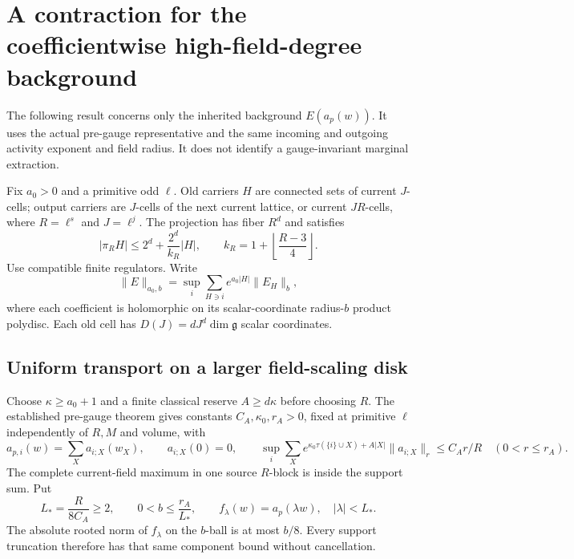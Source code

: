 \section{A contraction for the coefficientwise high-field-degree background}
\label{cdh-section}

The following result concerns only the inherited background
$E(a_p(w))$. It uses the actual pre-gauge representative and the
same incoming and outgoing activity exponent and field radius.
It does not identify a gauge-invariant marginal extraction.

Fix $a_0>0$ and a primitive odd $\ell$. Old carriers $H$ are
connected sets of current $J$-cells; output carriers are
$J$-cells of the next current lattice, or current $JR$-cells,
where $R=\ell^s$ and $J=\ell^j$. The projection has fiber $R^d$
and satisfies
\begin{equation}
 |\pi_RH|\leq2^d+\frac{2^d}{k_R}|H|,
 \qquad k_R=1+\left\lfloor\frac{R-3}{4}\right\rfloor.
 \label{cdh-compression}
\end{equation}
Use compatible finite regulators. Write
\begin{equation}
 \|E\|_{a_0,b}
 =\sup_i\sum_{H\ni i}e^{a_0|H|}\|E_H\|_b,
 \label{cdh-input-norm}
\end{equation}
where each coefficient is holomorphic on its scalar-coordinate
radius-$b$ product polydisc. Each old cell has
$D(J)=dJ^d\dim\mathfrak g$ scalar coordinates.

\subsection{Uniform transport on a larger field-scaling disk}
\label{cdh-scaling-section}

Choose $\kappa\geq a_0+1$ and a finite classical reserve
$A\geq d\kappa$ before choosing $R$. The established pre-gauge
theorem gives constants $C_A,\kappa_0,r_A>0$, fixed at primitive
$\ell$ independently of $R,M$ and volume, with
\begin{equation}
 a_{p,i}(w)=\sum_Xa_{i;X}(w_X),\qquad a_{i;X}(0)=0,\qquad
 \sup_i\sum_Xe^{\kappa_0\tau(\{i\}\cup X)+A|X|}
                   \|a_{i;X}\|_r\leq C_A r/R
 \quad(0<r\leq r_A).
 \label{cdh-ap-input}
\end{equation}
The complete current-field maximum in one source $R$-block is
inside the support sum. Put
\begin{equation}
 L_*=\frac{R}{8C_A}\geq2,\qquad
 0<b\leq\frac{r_A}{L_*},\qquad
 f_\lambda(w)=a_p(\lambda w),\quad |\lambda|<L_*.
 \label{cdh-scaling}
\end{equation}
The absolute rooted norm of $f_\lambda$ on the $b$-ball is at
most $b/8$. Every support truncation therefore has that same
component bound without cancellation.

